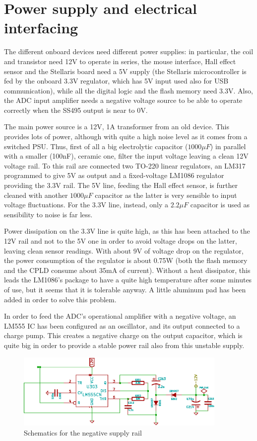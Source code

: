 \section{Power supply and electrical interfacing}
The different onboard devices need different power supplies: in particular, the coil and transistor need 12V to operate in series, the mouse interface, Hall effect sensor and the Stellaris board need a 5V supply (the Stellaris microcontroller is fed by the onboard 3.3V regulator, which has 5V input used also for USB communication), while all the digital logic and the flash memory need 3.3V. Also, the ADC input amplifier needs a negative voltage source to be able to operate correctly when the SS495 output is near to 0V.

The main power source is a 12V, 1A transformer from an old device. This provides lots of power, although with quite a high noise level as it comes from a switched PSU. Thus, first of all a big electrolytic capacitor ($1000\mu F$) in parallel with a smaller (100nF), ceramic one, filter the input voltage leaving a clean 12V voltage rail. To this rail are connected two TO-220 linear regulators, an LM317 programmed to give 5V as output and a fixed-voltage LM1086 regulator providing the 3.3V rail. The 5V line, feeding the Hall effect sensor, is further cleaned with another $1000\mu F$ capacitor as the latter is very sensible to input voltage fluctuations. For the 3.3V line, instead, only a $2.2\mu F$ capacitor is used as sensibility to noise is far less.

Power dissipation on the 3.3V line is quite high, as this has been attached to the 12V rail and not to the 5V one in order to avoid voltage drops on the latter, leaving clean sensor readings. With about 9V of voltage drop on the regulator, the power consumption of the regulator is about 0.75W (both the flash memory and the CPLD consume about 35mA of current). Without a heat dissipator, this leads the LM1086's package to have a quite high temperature after some minutes of use, but it seems that it is tolerable anyway. A little aluminum pad has been added in order to solve this problem.

In order to feed the ADC's operational amplifier with a negative voltage, an LM555 IC has been configured as an oscillator, and its output connected to a charge pump. This creates a negative charge on the output capacitor, which is quite big in order to provide a stable power rail also from this unstable supply.

\begin{figure}[htbp]
\centering
\includegraphics[width=4in]{Graphics/Supply}
\caption{Schematics for the negative supply rail}
\end{figure}


